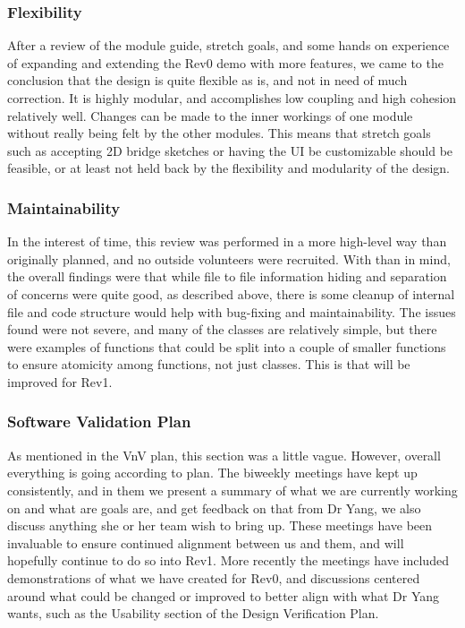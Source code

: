 \documentclass[12pt, titlepage]{article}
\begin{document}
\subsubsection{Flexibility}
After a review of the module guide, stretch goals, and some hands on experience of expanding and extending the Rev0 demo with more features, we came to the conclusion that
the design is quite flexible as is, and not in need of much correction. It is highly modular, and accomplishes low coupling and high cohesion relatively well. 
Changes can be made to the inner workings of one module without really being felt by the other modules. This means that stretch goals such as accepting 2D bridge sketches or
having the UI be customizable should be feasible, or at least not held back by the flexibility and modularity of the design.\\

\subsubsection{Maintainability}
In the interest of time, this review was performed in a more high-level way than originally planned, and no outside volunteers were recruited. With than in mind, 
the overall findings were that while file to file information hiding and separation of concerns were quite good, as described above, there is some cleanup of internal file 
and code structure would help with bug-fixing and maintainability. The issues found were not severe, and many of the classes are relatively simple, but there were examples of 
functions that could be split into a couple of smaller functions to ensure atomicity among functions, not just classes. This is that will be improved for Rev1.\\

\subsubsection{Software Validation Plan}
As mentioned in the VnV plan, this section was a little vague. However, overall everything is going according to plan. The biweekly meetings have kept up consistently, and in
them we present a summary of what we are currently working on and what are goals are, and get feedback on that from Dr Yang, we also discuss anything she or her team wish to
bring up. These meetings have been invaluable to ensure continued alignment between us and them, and will hopefully continue to do so into Rev1. More recently the meetings have
included demonstrations of what we have created for Rev0, and discussions centered around what could be changed or improved to better align with what Dr Yang wants, such as the
Usability section of the Design Verification Plan.\\
\end{document}
